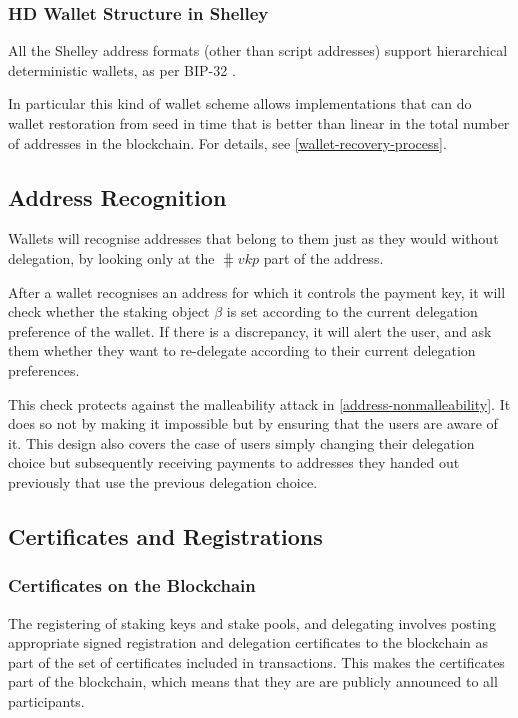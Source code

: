 \documentclass[11pt,a4paper,dvipsnames,twosided]{article}
\begin{document}
\subsubsection{HD Wallet Structure in Shelley}
\label{hd-wallet-structure-in-shelley}

All the Shelley address formats (other than script addresses) support
hierarchical deterministic wallets, as per BIP-32 \citep{bip32}.

In particular this kind of wallet scheme allows implementations that can
do wallet restoration from seed in time that is better than linear in
the total number of addresses in the blockchain. For details, see
\cref{wallet-recovery-process}.

\subsection{Address Recognition}
\label{address-recognition-1}

Wallets will recognise addresses that belong to them just as they would
without delegation, by looking only at the \(\hash{vkp}\) part
of the address.

After a wallet recognises an address for which it controls the payment
key, it will check whether the staking object \(\beta\) is set according
to the current delegation preference of the wallet. If there is a
discrepancy, it will alert the user, and ask them whether they want to
re-delegate according to their current delegation preferences.

This check protects against the malleability attack in
\cref{address-nonmalleability}. It does so not by making it impossible but
by ensuring that the users are aware of it. This design also covers the case
of users simply changing their delegation choice but subsequently receiving
payments to addresses they handed out previously that use the previous
delegation choice.

\subsection{Certificates and Registrations}
\label{certificates-and-registrations}

\subsubsection{Certificates on the Blockchain}
\label{certificates-on-the-blockchain}

The registering of staking keys and stake pools, and delegating
involves posting appropriate signed registration and delegation certificates to
the blockchain as part of the set of certificates included in
transactions. This makes the certificates part of
the blockchain, which means that they are are publicly announced to all
participants.
\end{document}
